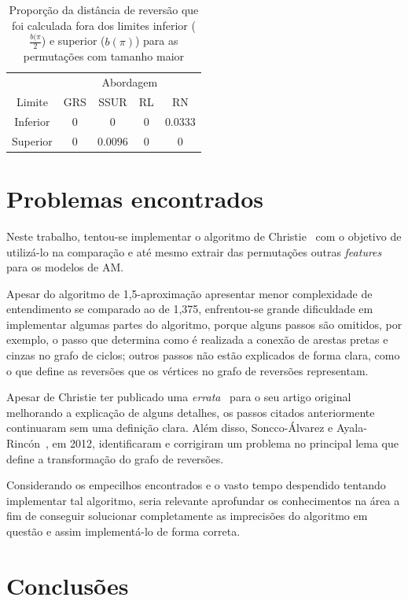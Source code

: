 \documentclass[runningheads,a4paper]{llncs}
\begin{document}
\begin{table}[H]
	\centering
	\caption{Proporção da distância de reversão que foi calculada fora dos limites inferior ($\frac{b(\pi}{2}$) e superior ($b(\pi)$) para as permutações com tamanho maior}
	\label{tab:5}
	\begin{tabular}{ccccc}
		\toprule
		&  \multicolumn{4}{c}{Abordagem}\\
		\cmidrule(lr){2-5}
		Limite & GRS & SSUR & RL & RN \\ 
		\midrule
		Inferior & 0 & 0 & 0 & $0.0333$\\ 
		Superior & 0 & $0.0096$ & 0 & 0 \\ 
		\bottomrule
	\end{tabular}
\end{table}

\section{Problemas encontrados}
\label{sec:problemas}
Neste trabalho, tentou-se implementar o algoritmo de Christie~\cite{Christie} com o objetivo de utilizá-lo na comparação e até mesmo extrair das permutações outras \textit{features} para os modelos de AM. 

Apesar do algoritmo de 1,5-aproximação apresentar menor complexidade de entendimento se comparado ao de 1,375, enfrentou-se grande dificuldade em implementar algumas partes do algoritmo, porque alguns passos são omitidos, por exemplo, o passo que determina como é realizada a conexão de arestas pretas e cinzas no grafo de ciclos; outros passos não estão explicados de forma clara, como o que define as reversões que os vértices no grafo de reversões representam. 

Apesar de Christie ter publicado uma \textit{errata}~\cite{ChristieERR} para o seu artigo original~\cite{Christie} melhorando a explicação de alguns detalhes, os passos citados anteriormente continuaram sem uma definição clara. Além disso, Soncco-Álvarez e Ayala-Rincón~\cite{Soncco}, em 2012, identificaram e corrigiram um problema no principal lema que define a transformação do grafo de reversões.

Considerando os empecilhos encontrados e o vasto tempo despendido tentando implementar tal algoritmo, seria relevante aprofundar os conhecimentos na área a fim de conseguir solucionar completamente as imprecisões do algoritmo em questão e assim implementá-lo de forma correta.


\section{Conclusões}
\label{sec:conclusoes}
    
\end{document}
